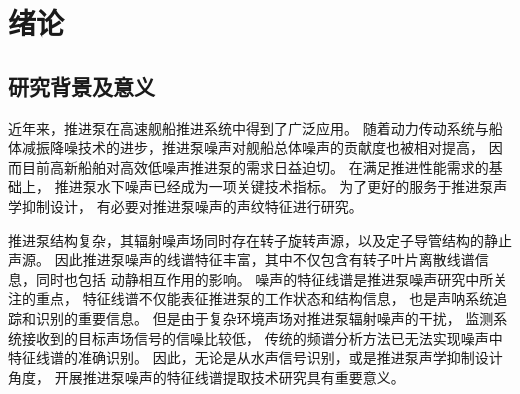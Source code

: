 \chapter{绪论}

\section{研究背景及意义}
近年来，推进泵在高速舰船推进系统中得到了广泛应用\cite{Carlton2012Marine}。
随着动力传动系统与船体减振降噪技术的进步，推进泵噪声对舰船总体噪声的贡献度也被相对提高，
因而目前高新船舶对高效低噪声推进泵的需求日益迫切\cite{ozdenUnderwaterRadiatedNoise2016}。
在满足推进性能需求的基础上，
推进泵水下噪声已经成为一项关键技术指标。
为了更好的服务于推进泵声学抑制设计，
有必要对推进泵噪声的声纹特征进行研究。

\begin{comment}
推进泵噪声机理较为复杂，抛开空化噪声不谈仅从流致噪声角度考虑，其频谱已呈现宽带与线谱交叠的形貌。
推进泵内非定常流动与水力部件相互作用产生的流致激励是重要的噪声激励源，
推进泵噪声信号中蕴含着丰富的流致激励源信息，流致激励源特征能反映推进泵的运行状态和结构信息。
当推进泵内流动发生显著改变时，其噪声信号的低频声纹理特性也会发生变化。
无论是从特征声源信号识别，或是发展噪声能量主动控制技术角度，
构建推进泵流致激励源识别的有效方法，建立流致激励源特征与噪声信号之间的联系都尤为重要。
\end{comment}

推进泵结构复杂，其辐射噪声场同时存在转子旋转声源，以及定子导管结构的静止声源。
因此推进泵噪声的线谱特征丰富，其中不仅包含有转子叶片离散线谱信息，同时也包括
动静相互作用的影响。
噪声的特征线谱是推进泵噪声研究中所关注的重点，
特征线谱不仅能表征推进泵的工作状态和结构信息，
也是声呐系统追踪和识别的重要信息。
但是由于复杂环境声场对推进泵辐射噪声的干扰，
监测系统接收到的目标声场信号的信噪比较低，
传统的频谱分析方法已无法实现噪声中特征线谱的准确识别。
因此，无论是从水声信号识别，或是推进泵声学抑制设计角度，
开展推进泵噪声的特征线谱提取技术研究具有重要意义。

